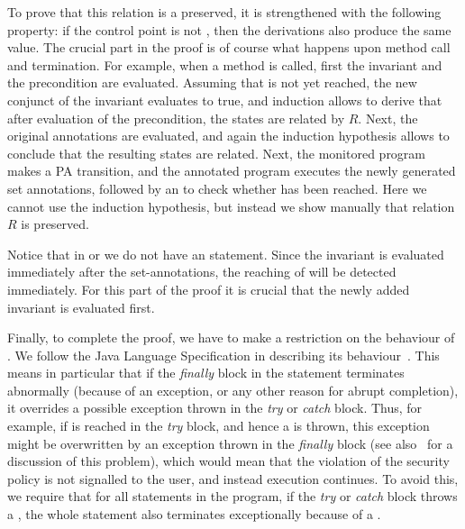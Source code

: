 To prove that this relation is a preserved, it is
strengthened with the following property: if the control point is not
\halted, then the derivations also produce the same value. The crucial
part in the proof is of course what happens upon method call and
termination. For example, when a method is called, first the invariant
and the precondition are evaluated. Assuming that \halted is not yet
reached, the new conjunct of the invariant evaluates to true, and
induction allows to derive that after evaluation of the precondition,
the states are related by \(R\). Next, the original \preset
annotations are evaluated, and again the induction hypothesis allows
to conclude that the resulting states are related. Next, the monitored
program makes a PA transition, and the annotated program executes the
newly generated set annotations, followed by an \Assert to check
whether
\halted has been reached. Here we cannot use the induction hypothesis,
but instead we show manually that relation \(R\) is preserved.

Notice that in \postset or \excset we do not have an \Assert
statement. Since the invariant is evaluated immediately after the
set-annotations, the reaching of \halted will be detected
immediately. For this part of the proof it is crucial that
the newly added invariant is evaluated first.

Finally,  to complete the proof, we have to make a
restriction on the behaviour of \TryCatch. We follow the Java Language
Specification in describing its behaviour~\cite{GoslingJSB05}. This
means in particular that if the \emph{finally} block in the statement
terminates abnormally (because of an exception, or any other reason
for abrupt completion), it overrides a possible exception thrown in
the \emph{try} or \emph{catch} block. Thus, for example, if \halted
is reached in the \emph{try} block, and hence a \JMLExc is thrown, this
exception might be overwritten by an exception thrown in the
\emph{finally} block (see also~\cite{Huisman08} for a discussion of
this problem), which would mean that the violation of the security
policy is not signalled to the user, and instead execution
continues. To avoid this, we require that for all \TryCatch statements
in the program, if the \emph{try} or
\emph{catch} block throws a \JMLExc, the whole statement
also terminates exceptionally because of a \JMLExc.



